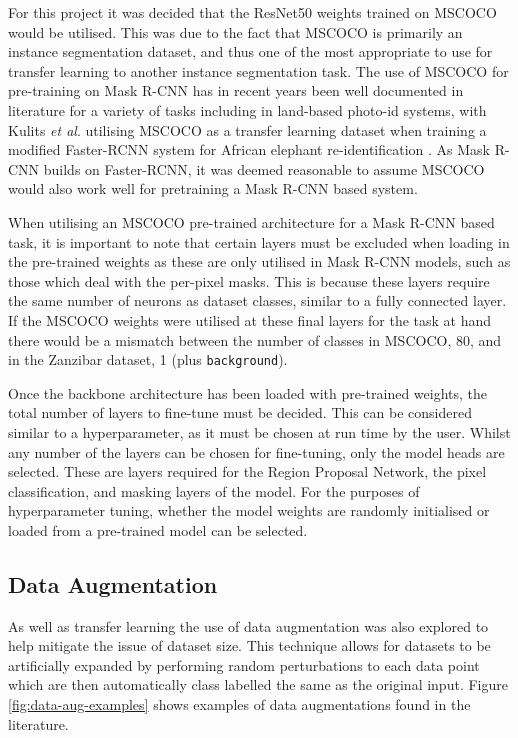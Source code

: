 For this project it was decided that the ResNet50 weights trained on MSCOCO \cite{lin_microsoft_2014} would be utilised. This was due to the fact that MSCOCO is primarily an instance segmentation dataset, and thus one of the most appropriate to use for transfer learning to another instance segmentation task. The use of MSCOCO for pre-training on Mask R-CNN has in recent years been well documented in literature for a variety of tasks \cite{yu_fruit_2019, couteaux_automatic_2019, fujita_fine-tuned_2020} including in land-based photo-id systems, with Kulits \textit{et al}. utilising MSCOCO as a transfer learning dataset when training a modified Faster-RCNN system for African elephant re-identification \cite{kulits_elephantbook_2021}. As Mask R-CNN builds on Faster-RCNN, it was deemed reasonable to assume MSCOCO would also work well for pretraining a Mask R-CNN based system.

When utilising an MSCOCO pre-trained architecture for a Mask R-CNN based task, it is important to note that certain layers must be excluded when loading in the pre-trained weights as these are only utilised in Mask R-CNN models, such as those which deal with the per-pixel masks. This is because these layers require the same number of neurons as dataset classes, similar to a fully connected layer. If the MSCOCO weights were utilised at these final layers for the task at hand there would be a mismatch between the number of classes in MSCOCO, 80, and in the Zanzibar dataset, 1 (plus \texttt{background}).

Once the backbone architecture has been loaded with pre-trained weights, the total number of layers to fine-tune must be decided. This can be considered similar to a hyperparameter, as it must be chosen at run time by the user. Whilst any number of the layers can be chosen for fine-tuning, only the model heads are selected. These are layers required for the Region Proposal Network, the pixel classification, and masking layers of the model. For the purposes of hyperparameter tuning, whether the model weights are randomly initialised or loaded from a pre-trained model can be selected.

\subsection{Data Augmentation}\label{ch:cetDet,sec:initialTesting,sub:dataaugmentation}

As well as transfer learning the use of data augmentation was also explored to help mitigate the issue of dataset size. This technique allows for datasets to be artificially expanded by performing random perturbations to each data point which are then automatically class labelled the same as the original input. Figure \ref{fig:data-aug-examples} shows examples of data augmentations found in the literature.

